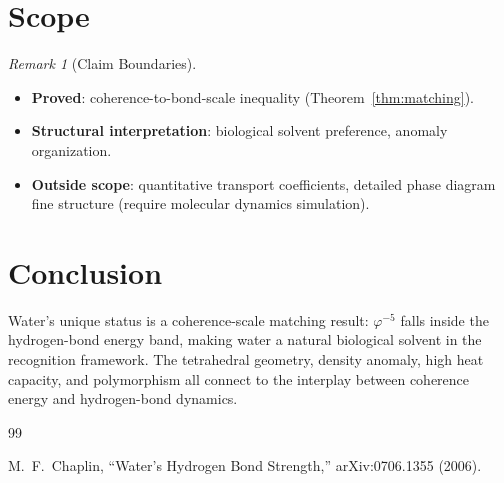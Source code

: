 \documentclass[12pt,a4paper]{article}
\theoremstyle{definition}
\theoremstyle{remark}
\newtheorem{remark}[theorem]{Remark}
\begin{document}
\section{Scope}
\label{sec:scope}

\begin{remark}[Claim Boundaries]
\begin{itemize}
  \item \textbf{Proved}: coherence-to-bond-scale inequality
  (Theorem~\ref{thm:matching}).
  \item \textbf{Structural interpretation}: biological solvent
  preference, anomaly organization.
  \item \textbf{Outside scope}: quantitative transport
  coefficients, detailed phase diagram fine structure (require
  molecular dynamics simulation).
\end{itemize}
\end{remark}

\section{Conclusion}
\label{sec:conclusion}

Water's unique status is a coherence-scale matching result:
$\varphi^{-5}$ falls inside the hydrogen-bond energy band, making
water a natural biological solvent in the recognition framework.
The tetrahedral geometry, density anomaly, high heat capacity, and
polymorphism all connect to the interplay between coherence energy
and hydrogen-bond dynamics.

\begin{thebibliography}{99}

M.~F.~Chaplin, ``Water's Hydrogen Bond Strength,''
arXiv:0706.1355 (2006).

\end{thebibliography}
\end{document}
